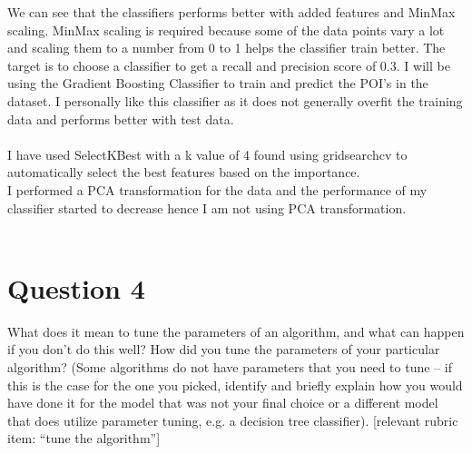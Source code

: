 \documentclass[12pt]{article}%
\begin{document}
\begin{figure}[!htbp]
\centering
\end{figure}
\newpage
We can see that the classifiers performs better with added features and MinMax scaling. MinMax scaling is required because some of the data points vary a lot and scaling them to a number from 0 to 1 helps the classifier train better. The target is to choose a classifier to get a recall and precision score of 0.3. I will be using the Gradient Boosting Classifier to train and predict the POI's in the dataset. I personally like this classifier as it does not generally overfit the training data and performs better with test data.
\\
\\
I have used SelectKBest with a k value of 4 found using gridsearchcv to automatically select the best features based on the importance.
\\
I performed a PCA transformation for the data and the performance of my classifier started to decrease hence I am not using PCA transformation.
\\
\\

\section*{Question 4}
What does it mean to tune the parameters of an algorithm, and what can happen if you don’t do this well?  How did you tune the parameters of your particular algorithm? (Some algorithms do not have parameters that you need to tune -- if this is the case for the one you picked, identify and briefly explain how you would have done it for the model that was not your final choice or a different model that does utilize parameter tuning, e.g. a decision tree classifier).  [relevant rubric item: “tune the algorithm”]
\end{document}
